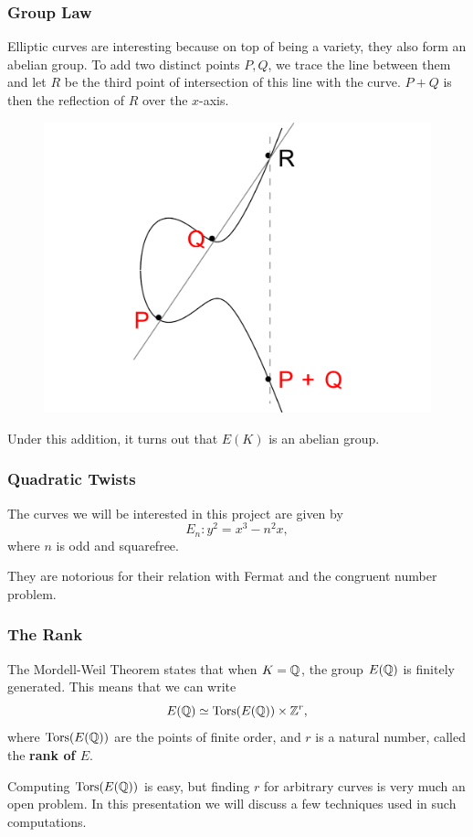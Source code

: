 \message{ !name(presentation.tex)}\documentclass{beamer}
\begin{document}
\begin{frame}
  \frametitle{Group Law}
  Elliptic curves are interesting because on top of being a variety, they also
  form an abelian group. To add two distinct points $P, Q$, we trace the line
  between them and let $R$ be the third point of intersection of this line with
  the curve. $P+Q$ is then the reflection of $R$ over the $x$-axis. \pause
  \begin{figure}
    \centering
  \includegraphics{picture3}
  \end{figure} \pause

  Under this addition, it turns out that $E(K)$ is an abelian group.
\end{frame}

\begin{frame}
  \frametitle{Quadratic Twists}
  The curves we will be interested in this project are given by
  \[E_n : y^2 = x^3 - n^2 x,\]
  where $n$ is odd and squarefree. \pause

  They are notorious for their relation with Fermat and the
  congruent number problem.
\end{frame}

\begin{frame}
  \frametitle{The Rank}
  The Mordell-Weil Theorem states that when $K = {\mathbb Q}$, the group $E({\mathbb Q})$ is
  finitely generated. This means that we can write
  \[E({\mathbb Q}) \simeq {\text{\normalfont Tors}}(E({\mathbb Q})) \times {\mathbb Z}^r,\]
  where ${\text{\normalfont Tors}}(E({\mathbb Q}))$ are the points of finite order, and $r$ is a natural
  number, called the \textbf{rank of $E$}. \pause
  \bigskip

  Computing ${\text{\normalfont Tors}}(E({\mathbb Q}))$ is easy, but finding $r$ for arbitrary
  curves is very much an open problem. In this presentation we will discuss a
  few techniques used in such computations.
\end{frame}
 
\end{document}
